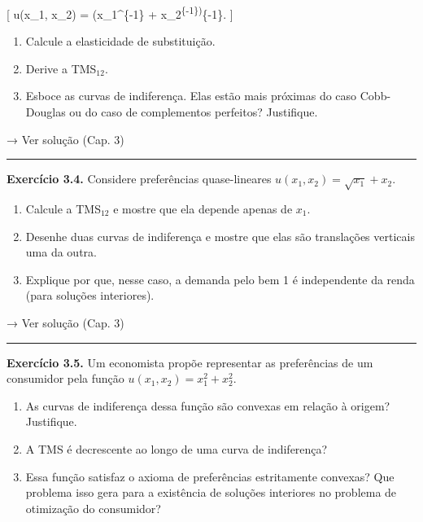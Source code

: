 \documentclass[11pt,twoside,openright]{book}
\begin{document}
{[} u(x\_1, x\_2) = \left(x\_1\^{}\{-1\} +
x\_2\textsuperscript{\{-1\}\right)}\{-1\}. {]}

\begin{enumerate}
\def\labelenumi{(\alph{enumi})}
\item
  Calcule a elasticidade de substituição.
\item
  Derive a TMS\(_{12}\).
\item
  Esboce as curvas de indiferença. Elas estão mais próximas do caso
  Cobb-Douglas ou do caso de complementos perfeitos? Justifique.
\end{enumerate}

→ Ver solução (Cap. 3)

\begin{center}\rule{0.5\linewidth}{0.5pt}\end{center}

\textbf{Exercício 3.4.} Considere preferências quase-lineares
\(u(x_1, x_2) = \sqrt{x_1} + x_2\).

\begin{enumerate}
\def\labelenumi{(\alph{enumi})}
\item
  Calcule a TMS\(_{12}\) e mostre que ela depende apenas de \(x_1\).
\item
  Desenhe duas curvas de indiferença e mostre que elas são translações
  verticais uma da outra.
\item
  Explique por que, nesse caso, a demanda pelo bem 1 é independente da
  renda (para soluções interiores).
\end{enumerate}

→ Ver solução (Cap. 3)

\begin{center}\rule{0.5\linewidth}{0.5pt}\end{center}

\textbf{Exercício 3.5.} Um economista propõe representar as preferências
de um consumidor pela função \(u(x_1, x_2) = x_1^2 + x_2^2\).

\begin{enumerate}
\def\labelenumi{(\alph{enumi})}
\item
  As curvas de indiferença dessa função são convexas em relação à
  origem? Justifique.
\item
  A TMS é decrescente ao longo de uma curva de indiferença?
\item
  Essa função satisfaz o axioma de preferências estritamente convexas?
  Que problema isso gera para a existência de soluções interiores no
  problema de otimização do consumidor?
\end{enumerate}
\end{document}
